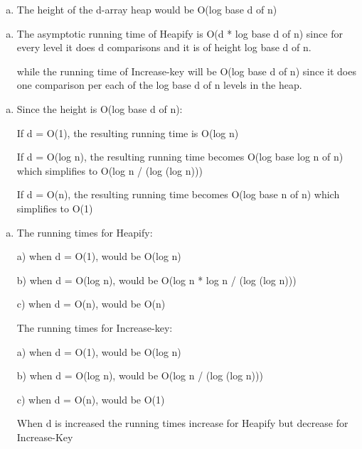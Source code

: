 \documentclass[12pt]{article}
\begin{document}
\begin{enumerate}[(c)]

\item
The height of the d-array heap would be O(log base d of n)

\end{enumerate}

\begin{enumerate}[(d)]

\item
The asymptotic running time of Heapify is O(d * log base d of n) since for every level it does d comparisons and it is of height log base d of n.

while the running time of Increase-key will be O(log base d of n) since it does one comparison per each of the log base d of n levels in the heap.

\end{enumerate}

\begin{enumerate}[(e)]

\item
Since the height is O(log base d of n):
 
If d = O(1), the resulting running time is O(log n)

If d = O(log n), the resulting running time becomes O(log base log n of n) which simplifies to O(log n / (log (log n)))

If d = O(n), the resulting running time becomes O(log base n of n) which simplifies to O(1)

\end{enumerate}

\begin{enumerate}[(f)]

\item
The running times for Heapify:

a) when d = O(1), would be O(log n)

b) when d = O(log n), would be O(log n * log n / (log (log n)))

c) when d = O(n), would be O(n)

The running times for Increase-key:

a) when d = O(1), would be O(log n)

b) when d = O(log n), would be O(log n / (log (log n)))

c) when d = O(n), would be O(1)

When d is increased the running times increase for Heapify but decrease for Increase-Key

\end{enumerate}
\end{document}
